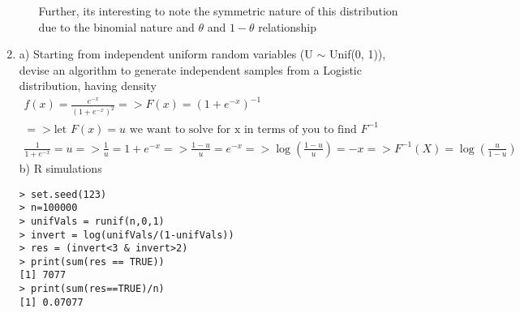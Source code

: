 \documentclass[11pt]{article}
\begin{document}
\begin{enumerate}
\begin{enumerate}
	Further, its interesting to note the symmetric nature of this distribution due to the binomial nature and  $\theta$ and $1-\theta$ relationship
\end{enumerate}
\item a) Starting from independent uniform random variables (U $\sim$ Unif(0, 1)), devise an algorithm to generate independent samples from a Logistic distribution, having density
\begin{gather}
	f(x) = \frac{e^{-x}}{(1+e^{-x})^2} => F(x) = (1+e^{-x})^{-1}\\
	=> \text{let } F(x) = u \text{ we want to solve for x in terms of you to find  } F^{-1} \\
	\frac{1}{1+e^{-x}} = u => \frac{1}{u} = 1+e^{-x} => \frac{1-u}{u} = e^{-x} => \log(\frac{1-u}{u}) = -x => F^{-1}(X) = \log(\frac{u}{1-u})
\end{gather}
b) R simulations
\begin{verbatim}
> set.seed(123)
> n=100000
> unifVals = runif(n,0,1)
> invert = log(unifVals/(1-unifVals))
> res = (invert<3 & invert>2)
> print(sum(res == TRUE))
[1] 7077
> print(sum(res==TRUE)/n)
[1] 0.07077
\end{verbatim}
\end{enumerate}
\end{document}
